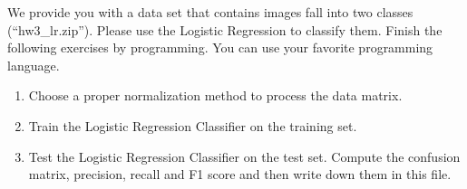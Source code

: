 \documentclass[11pt,letter,notitlepage]{article}
\begin{document}
\newpage
\begin{exercise}
We provide you with a data set that contains images fall into two classes (``hw3\_lr.zip''). Please use the Logistic Regression to classify them.
Finish the following exercises by programming. You can use your favorite programming language.
\begin{enumerate}
\item Choose a proper normalization method to process the data matrix.
\item Train the Logistic Regression Classifier on the training set.
\item Test the Logistic Regression Classifier on the test set. Compute the confusion matrix, precision, recall and F1 score and then write down them in this file.
\end{enumerate}
\end{exercise}




\end{document}
